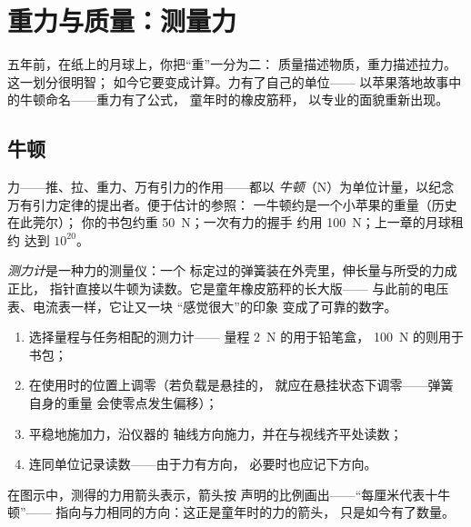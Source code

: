 \chapter{重力与质量：测量力}\label{ch:g9:weight-vs-mass}

五年前，在纸上的月球上，你把“重”一分为二：
质量描述物质，重力描述拉力。这一划分很明智；
如今它要变成计算。力有了自己的单位——
以苹果落地故事中的牛顿命名——重力有了公式，
童年时的橡皮筋秤，
以专业的面貌重新出现。

\section{牛顿}

\begin{definition}[牛顿]\label{def:g9:weight-vs-mass:newton}
力——推、拉、重力、万有引力的作用——都以
\emph{牛顿}（\unit{N}）为单位计量，以纪念
万有引力定律的提出者。便于估计的参照：
一牛顿约是一个小苹果的重量（历史在此莞尔）；
你的书包约重 \qty{50}{N}；一次有力的握手
约用 \qty{100}{N}；上一章的月球租约
达到 $10^{20}$。
\end{definition}

\begin{definition}[测力计]\label{def:g9:weight-vs-mass:dynamometer}
\emph{测力计}是一种力的测量仪：一个
标定过的弹簧装在外壳里，伸长量与所受的力成正比，
指针直接以牛顿为读数。它是童年橡皮筋秤的长大版——
与此前的电压表、电流表一样，它让又一块
“感觉很大”的印象
变成了可靠的数字。
\end{definition}

\begin{method}[测量力]\label{met:g9:weight-vs-mass:measure}
\begin{enumerate}
  \item 选择量程与任务相配的测力计——
        量程 \qty{2}{N} 的用于铅笔盒，
        \qty{100}{N} 的则用于书包；
  \item 在使用时的位置上调零（若负载是悬挂的，
        就应在悬挂状态下调零——弹簧自身的重量
        会使零点发生偏移）；
  \item 平稳地施加力，沿仪器的
        轴线方向施力，并在与视线齐平处读数；
  \item 连同单位记录读数——由于力有方向，
        必要时也应记下方向。
\end{enumerate}
在图示中，测得的力用箭头表示，箭头按
声明的比例画出——“每厘米代表十牛顿”——
指向与力相同的方向：这正是童年时的力的箭头，
只是如今有了数量。
\end{method}

